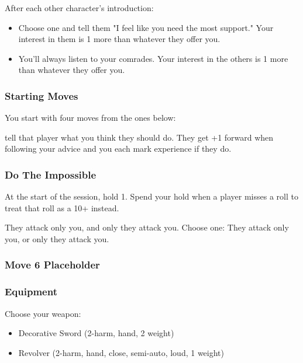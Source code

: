 After each other character's introduction:
\begin{itemize}
\item Choose one and tell them "I feel like you need the most support." Your interest in them is 1 more than whatever they offer you.
\item You'll always listen to your comrades. Your interest in the others is 1 more than whatever they offer you.
\end{itemize}

\subsubsection{Starting Moves}
You start with four moves from the ones below:


{tell that player what you think they should do. They get +1 forward
when following your advice and you each mark experience if they do.}
           
\subsubsection{Do The Impossible}
At the start of the session, hold 1.
Spend your hold when a player misses a roll to treat that roll as a 10+ instead.


{They attack only you, and only they attack you.}
{Choose one: They attack only you, or only they attack you.}

\subsubsection{Move 6 Placeholder} %

\subsubsection{Equipment}
Choose your weapon:
\begin{itemize}
\item Decorative Sword (2-harm, hand, 2 weight)
\item Revolver (2-harm, hand, close, semi-auto, loud, 1 weight)
\end{itemize}

